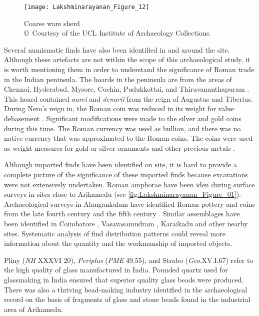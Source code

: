 \begin{figure}[!htb]
	\texttt{[image: Lakshminarayanan\_Figure\_12]}
	\caption{Coarse ware sherd\\
		{\normalfont\scriptsize\copyright\ Courtesy of the UCL Institute of Archaeology Collections.
	}}
	\label{fig:Lakshminarayanan_Figure_12}
\end{figure}

Several numismatic finds have also been identified in and around the site. Although these artefacts are not within the scope of this archaeological study, it is worth mentioning them in order to understand the significance of Roman trade in the Indian peninsula. The hoards in the peninsula are from the areas of Chennai, Hyderabad, Mysore, Cochin, Pudukkottai, and Thiruvananthapuram \parencite[][]{turner2016}. This hoard contained \emph{aurei} and \emph{denarii} from the reign of Augustus and Tiberius. During Nero’s reign in, the Roman coin was reduced in its weight for value debasement \parencite[][68]{lannoye2015}. Significant modifications were made to the silver and gold coins during this time. The Roman currency was used as bullion, and there was no native currency that was approximated to the Roman coins. The coins were used as weight measures for gold or silver ornaments and other precious metals \parencite[][167]{wheeler1955}.

Although imported finds have been identified on site, it is hard to provide a complete picture of the significance of these imported finds because excavations were not extensively undertaken. Roman amphorae have been iden during surface surveys in sites close to Arikamedu (see \cref{fig:Lakshminarayanan_Figure_01}). Archaeological surveys in Alangankulam have identified Roman pottery and coins from the late fourth century and the fifth century\AD
\parencite{kasinathan1994}.
Similar assemblages have been identified in Coimbatore \parencite[][244]{tchernia2016}, Vasavasamudram \parencite[][133]{champakalakshmi1996}, Karaikadu \parencite[][111]{ramachandran1980} and other nearby sites. Systematic analysis of find distribution patterns could reveal more information about the quantity and the workmanship of imported objects.


Pliny (\emph{NH} XXXVI 20), \emph{Periplus} (\emph{PME} 49,55), and Strabo (\emph{Geo}.XV.I.67) refer to the high quality of glass manufactured in India. Pounded quartz used for glassmaking in India ensured that superior quality glass beads were produced. There was also a thriving bead-making industry identified in the archaeological record on the basis of fragments of glass and stone beads found in the industrial area of Arikamedu.

